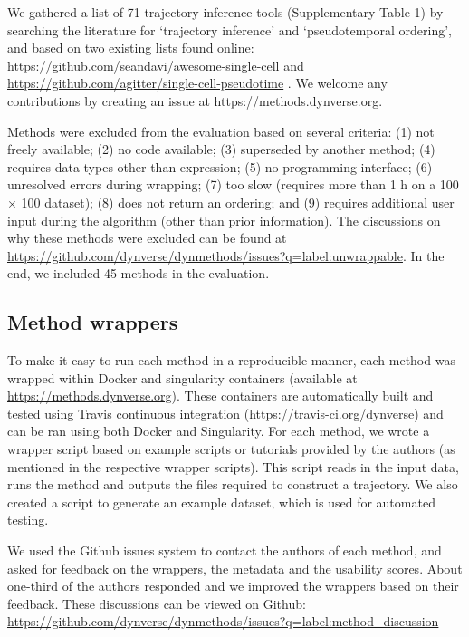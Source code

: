 We gathered a list of 71 trajectory inference tools (Supplementary Table 1) by searching the literature for ‘trajectory inference’ and ‘pseudotemporal ordering’, and based on two existing lists found online: \href{https://github.com/seandavi/awesome-single-cell}{https://github.com/seandavi/awesome-single-cell} \cite{davis_awesomesinglecell_2018} and \href{https://github.com/agitter/single-cell-pseudotime}{https://github.com/agitter/single-cell-pseudotime} \cite{gitter_singlecellrnaseqpseudotime_2018}. We welcome any contributions by creating an issue at https://methods.dynverse.org.

Methods were excluded from the evaluation based on several criteria: (1) not freely available; (2) no code available; (3) superseded by another method; (4) requires data types other than expression; (5) no programming interface; (6) unresolved errors during wrapping; (7) too slow (requires more than 1 h on a 100 $\times$ 100 dataset); (8) does not return an ordering; and (9) requires additional user input during the algorithm (other than prior information). The discussions on why these methods were excluded can be found at \href{https://github.com/dynverse/dynmethods/issues?q=label:unwrappable}{https://github.com/dynverse/dynmethods/issues?q=label:unwrappable}. In the end, we included 45 methods in the evaluation.


\subsection{Method wrappers}

To make it easy to run each method in a reproducible manner, each method was wrapped within Docker and singularity containers (available at \href{https://methods.dynverse.org}{https://methods.dynverse.org}). These containers are automatically built and tested using Travis continuous integration (\href{https://travis-ci.org/dynverse}{https://travis-ci.org/dynverse}) and can be ran using both Docker and Singularity. For each method, we wrote a wrapper script based on example scripts or tutorials provided by the authors (as mentioned in the respective wrapper scripts). This script reads in the input data, runs the method and outputs the files required to construct a trajectory. We also created a script to generate an example dataset, which is used for automated testing.

We used the Github issues system to contact the authors of each method, and asked for feedback on the wrappers, the metadata and the usability scores. About one-third of the authors responded and we improved the wrappers based on their feedback. These discussions can be viewed on Github: \href{https://github.com/dynverse/dynmethods/issues?q=label:method_discussion}{https://github.com/dynverse/dynmethods/issues?q=label:method\_discussion}

